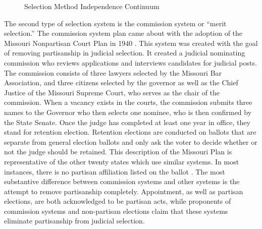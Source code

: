 \documentclass[12pt]{article}
\begin{document}
\begin{figure}[tbh]\centering\caption{Selection Method Independence Continuum}\label{selectioncontinuum}
\end{figure} 

The second type of selection system is the commission system or “merit selection.” The commission system plan came about with the adoption of the Missouri Nonpartisan Court Plan in 1940 \citep{Watson1969}. This system was created with the goal of removing partisanship in judicial selection. It created a judicial nominating commission who reviews applications and interviews candidates for judicial posts. The commission consists of three lawyers selected by the Missouri Bar Association, and three citizens selected by the governor as well as the Chief Justice of the Missouri Supreme Court, who serves as the chair of the commission. When a vacancy exists in the courts, the commission submits three names to the Governor who then selects one nominee, who is then confirmed by the State Senate. Once the judge has completed at least one year in office, they stand for retention election. Retention elections are conducted on ballots that are separate from general election ballots and only ask the voter to decide whether or not the judge should be retained. This description of the Missouri Plan is representative of the other twenty states which use similar systems.  In most instances, there is no partisan affiliation listed on the ballot \citep{Watson1969}.  The most substantive difference between commission systems and other systems is the attempt to remove partisanship completely. Appointment, as well as partisan elections, are both acknowledged to be partisan acts, while proponents of commission systems and non-partisan elections claim that these systems eliminate partisanship from judicial selection. 
\end{document}
